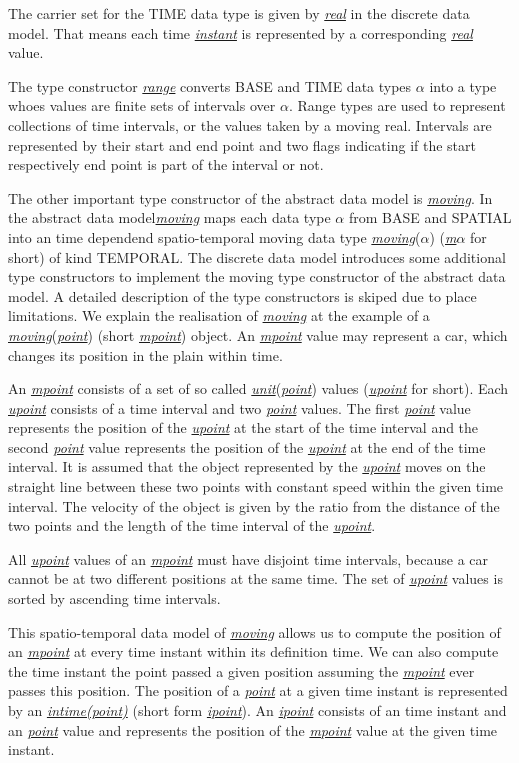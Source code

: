 \documentclass[a4paper]{article}
\newcommand{\dt}[1]{\textsl{\underline{#1}}}
\begin{document}
The carrier set for the TIME data type is given by \dt{real} in the discrete data model.
That means each time \dt{instant} is represented by a corresponding \dt{real} value.

The type constructor \dt{range} converts BASE and TIME data types $\alpha$ into
a type whoes values are finite sets of intervals over $\alpha$. Range types are
used to represent collections of time intervals, or the values taken by a moving
real. Intervals are represented by their start and end point and two flags indicating
if the start respectively end point is part of the interval or not.

The other important type constructor of the abstract data model is \dt{moving}.
In the abstract data model\dt{moving} maps each data type $\alpha$ from BASE and
SPATIAL into an time dependend spatio-temporal moving data type \dt{moving}($\alpha$)
(\dt{m$\alpha$} for short) of kind TEMPORAL. The discrete data model introduces some
additional type constructors to implement the moving type constructor of the
abstract data model. A detailed description of the type constructors is skiped
due to place limitations. We explain the realisation of \dt{moving} at the example
of a \dt{moving}(\dt{point}) (short \dt{mpoint}) object. An \dt{mpoint} value may represent
a car, which changes its position in the plain within time.

An \dt{mpoint} consists of a set of so called \dt{unit}(\dt{point}) values
(\dt{upoint} for short).
Each \dt{upoint} consists of a time interval and two \dt{point} values. The first
\dt{point} value represents the position of the \dt{upoint} at the start of the
time interval and the second \dt{point} value represents the position of the
\dt{upoint} at the end of the time interval. It is assumed that the object represented
by the \dt{upoint} moves on the straight line between these two points with constant
speed within the given time interval. The velocity of the object is given by the
ratio from the distance of the two points and the length of the time interval of
the \dt{upoint}.

All \dt{upoint} values of an \dt{mpoint} must have disjoint time intervals,
because a car cannot be at two different positions at the same time.
The set of \dt{upoint} values is sorted by ascending time intervals.

This spatio-temporal data model of \dt{moving} allows us to compute the position
of an \dt{mpoint} at every time instant within its definition time.
We can also compute the time instant the point passed a
given position assuming the \dt{mpoint} ever passes this position. The position of a
\dt{point} at a given time instant is represented by an \dt{intime(point)}
(short form \dt{ipoint}). An \dt{ipoint} consists of an time instant and an \dt{point}
value and represents the position of the \dt{mpoint} value at the given time instant.
\end{document}
